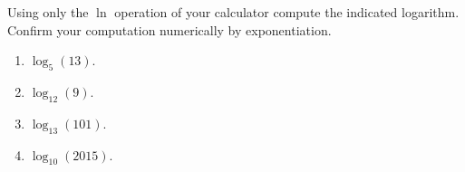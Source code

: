 Using only the $\ln$ operation of your calculator compute the indicated logarithm. Confirm your computation numerically by exponentiation.


\begin{multicols}{2}
\begin{enumerate}[ref={\fcProblemRef}]
\item  $\log_{5}(13)$. 

\item  $\log_{12}(9)$. 

\item  $\log_{13}(101)$. 

\item  $\log_{10}(2015)$. 


\end{enumerate}
\end{multicols}

